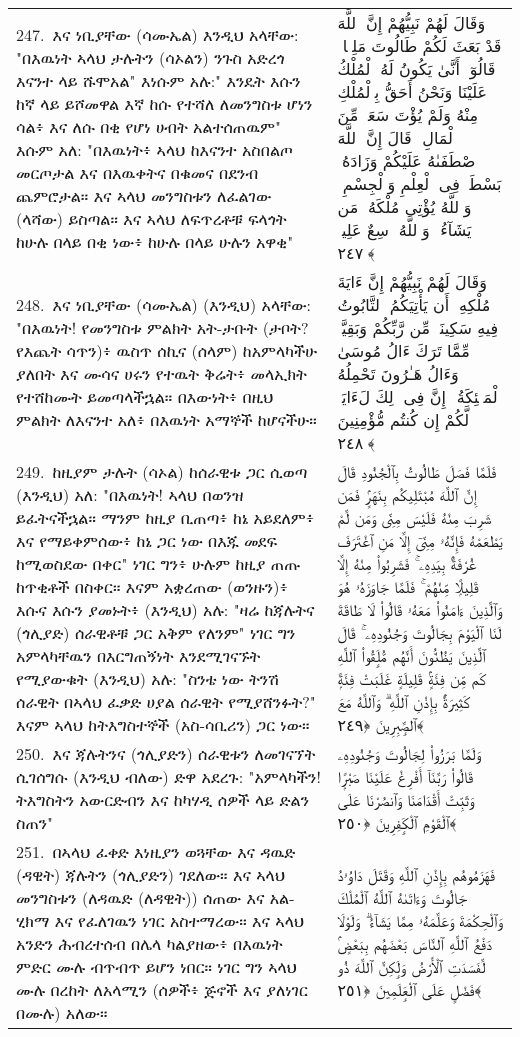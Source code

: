 \documentclass[11pt,a4paper,oneside]{article}%
\newcommand{\mytextarabic}[1]{\textarabic{ #1 \flushright}}
\begin{document}
\begin{longtable}{%
  @{}
    p{}
  @{~~~}
    p{}
    @{}
}
247.\ እና ነቢያቸው (ሳሙኤል) እንዲህ አላቸው: "በእዉነት ኣላህ ታሉትን (ሳኦልን) ንጉስ አድረጎ እናንተ ላይ ሹሞአል" እነሱም አሉ:" እንዴት እሱን ከኛ ላይ ይሾመዋል እኛ ከሱ የተሻለ ለመንግስቱ ሆነን ሳል፥ እና ለሱ በቂ የሆነ ሀብት አልተሰጠዉም" እሱም አለ: "በእዉነት፥ ኣላህ ከእናንተ አስበልጦ መርጦታል እና በእዉቀትና በቁመና በደንብ ጨምሮታል። እና ኣላህ መንግስቱን ለፈልገው (ላሻው) ይስጣል። እና ኣላህ ለፍጥረቶቹ ፍላጎት ከሁሉ በላይ በቂ ነው፥ ከሁሉ በላይ ሁሉን አዋቂ" &  \mytextarabic{وَقَالَ لَهُمْ نَبِيُّهُمْ إِنَّ ٱللَّهَ قَدْ بَعَثَ لَكُمْ طَالُوتَ مَلِكًۭا ۚ قَالُوٓا۟ أَنَّىٰ يَكُونُ لَهُ ٱلْمُلْكُ عَلَيْنَا وَنَحْنُ أَحَقُّ بِٱلْمُلْكِ مِنْهُ وَلَمْ يُؤْتَ سَعَةًۭ مِّنَ ٱلْمَالِ ۚ قَالَ إِنَّ ٱللَّهَ ٱصْطَفَىٰهُ عَلَيْكُمْ وَزَادَهُۥ بَسْطَةًۭ فِى ٱلْعِلْمِ وَٱلْجِسْمِ ۖ وَٱللَّهُ يُؤْتِى مُلْكَهُۥ مَن يَشَآءُ ۚ وَٱللَّهُ وَٟسِعٌ عَلِيمٌۭ ﴿٢٤٧﴾}\\
248.\ እና ነቢያቸው (ሳሙኤል) (እንዲህ) አላቸው: "በእዉነት! የመንግስቱ ምልክት አት-ታቡት (ታቦት? የእጨት ሳጥን)፥ ዉስጥ ሰኪና (ሰላም) ከአምላካችሁ ያለበት እና ሙሳና ሀሩን የተዉት ቅሬት፥ መላኢክት የተሸከሙት ይመጣላችኋል። በእውነት፥ በዚህ ምልክት ለእናንተ አለ፥ በእዉነት አማኞች ከሆናችሁ። &  \mytextarabic{وَقَالَ لَهُمْ نَبِيُّهُمْ إِنَّ ءَايَةَ مُلْكِهِۦٓ أَن يَأْتِيَكُمُ ٱلتَّابُوتُ فِيهِ سَكِينَةٌۭ مِّن رَّبِّكُمْ وَبَقِيَّةٌۭ مِّمَّا تَرَكَ ءَالُ مُوسَىٰ وَءَالُ هَـٰرُونَ تَحْمِلُهُ ٱلْمَلَٟٓئِكَةُ ۚ إِنَّ فِى ذَٟلِكَ لَءَايَةًۭ لَّكُمْ إِن كُنتُم مُّؤْمِنِينَ ﴿٢٤٨﴾}\\
249.\ ከዚያም ታሉት (ሳኦል) ከሰራዊቱ ጋር ሲወጣ (እንዲህ) አለ: "በእዉነት! ኣላህ በወንዝ ይፈትናችኋል። ማንም ከዚያ ቢጠጣ፥ ከኔ አይደለም፥ እና የማይቀምሰው፥ ከኔ ጋር ነው በእጁ መደፍ ከሚወስደው በቀር" ነገር ግን፥ ሁሉም ከዚያ ጠጡ ከጥቂቶች በስቀር። እናም አቋረጠው (ወንዙን)፥ እሱና እሱን ያመኑት፥ (እንዲህ) አሉ: "ዛሬ ከጃሉትና (ጎሊያድ) ሰራዊቶቹ ጋር አቅም የለንም" ነገር ግን አምላካቸዉን በእርግጠኝነት እንደሚገናኙት የሚያውቁት (እንዲህ) አሉ: "ስንቴ ነው ትንሽ ሰራዊት በኣላህ ፈቃድ ሀያል ሰራዊት የሚያሸንፉት?" እናም ኣላህ ከትእግስተኞች (አስ-ሳቢሪን) ጋር ነው።  &  \mytextarabic{فَلَمَّا فَصَلَ طَالُوتُ بِٱلْجُنُودِ قَالَ إِنَّ ٱللَّهَ مُبْتَلِيكُم بِنَهَرٍۢ فَمَن شَرِبَ مِنْهُ فَلَيْسَ مِنِّى وَمَن لَّمْ يَطْعَمْهُ فَإِنَّهُۥ مِنِّىٓ إِلَّا مَنِ ٱغْتَرَفَ غُرْفَةًۢ بِيَدِهِۦ ۚ فَشَرِبُوا۟ مِنْهُ إِلَّا قَلِيلًۭا مِّنْهُمْ ۚ فَلَمَّا جَاوَزَهُۥ هُوَ وَٱلَّذِينَ ءَامَنُوا۟ مَعَهُۥ قَالُوا۟ لَا طَاقَةَ لَنَا ٱلْيَوْمَ بِجَالُوتَ وَجُنُودِهِۦ ۚ قَالَ ٱلَّذِينَ يَظُنُّونَ أَنَّهُم مُّلَٟقُوا۟ ٱللَّهِ كَم مِّن فِئَةٍۢ قَلِيلَةٍ غَلَبَتْ فِئَةًۭ كَثِيرَةًۢ بِإِذْنِ ٱللَّهِ ۗ وَٱللَّهُ مَعَ ٱلصَّٟبِرِينَ ﴿٢٤٩﴾}\\
250.\ እና ጃሉትንና (ጎሊያድን) ሰራዊቱን ለመገናኘት ሲገሰግሱ (እንዲህ ብለው) ድዋ አደረጉ: "አምላካችን! ትእግስትን አውርድብን እና ከካሃዲ ሰዎች ላይ ድልን ስጠን" &  \mytextarabic{وَلَمَّا بَرَزُوا۟ لِجَالُوتَ وَجُنُودِهِۦ قَالُوا۟ رَبَّنَآ أَفْرِغْ عَلَيْنَا صَبْرًۭا وَثَبِّتْ أَقْدَامَنَا وَٱنصُرْنَا عَلَى ٱلْقَوْمِ ٱلْكَٟفِرِينَ ﴿٢٥٠﴾}\\
251.\ በኣላህ ፈቀድ እነዚያን ወጓቸው እና ዳዉድ (ዳዊት) ጃሉትን (ጎሊያድን) ገደለው። እና ኣላህ መንግስቱን (ለዳዉድ (ለዳዊት)) ሰጠው እና አል-ሂክማ እና የፈለገዉን ነገር አስተማረው። እና ኣላህ አንድን ሕብረተሰብ በሌላ ካልያዘው፥ በእዉነት ምድር ሙሉ ብጥብጥ ይሆን ነበር። ነገር ግን ኣላህ ሙሉ በረከት ለአላሚን (ሰዎች፥ ጅኖች እና ያለነገር በሙሉ) አለው። &  \mytextarabic{فَهَزَمُوهُم بِإِذْنِ ٱللَّهِ وَقَتَلَ دَاوُۥدُ جَالُوتَ وَءَاتَىٰهُ ٱللَّهُ ٱلْمُلْكَ وَٱلْحِكْمَةَ وَعَلَّمَهُۥ مِمَّا يَشَآءُ ۗ وَلَوْلَا دَفْعُ ٱللَّهِ ٱلنَّاسَ بَعْضَهُم بِبَعْضٍۢ لَّفَسَدَتِ ٱلْأَرْضُ وَلَٟكِنَّ ٱللَّهَ ذُو فَضْلٍ عَلَى ٱلْعَٟلَمِينَ ﴿٢٥١﴾}\\

\end{longtable}
\end{document}
